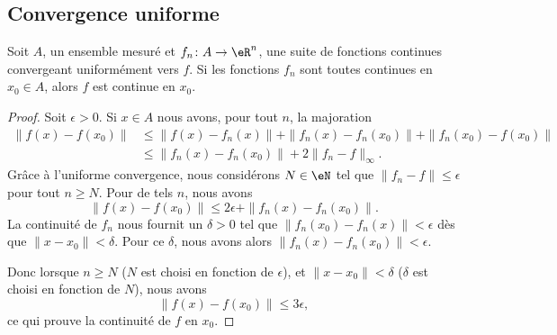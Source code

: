 \subsection{Convergence uniforme}


\begin{theorem}			\label{ThoUnigCvCont}
	Soit \( A\), un ensemble mesuré et \( f_n\colon A\to \eR^n\), une suite de fonctions continues convergeant uniformément vers \( f\). Si les fonctions \( f_n\) sont toutes continues en \( x_0\in A\), alors \( f\) est continue en \( x_0\).
\end{theorem}

\begin{proof}
	Soit \( \epsilon>0\). Si \( x\in A\) nous avons, pour tout \( n\), la majoration
	\begin{subequations}
		\begin{align}
			\| f(x)-f(x_0) \| & \leq \| f(x)-f_n(x) \|+\| f_n(x)-f_n(x_0) \|+\| f_n(x_0)-f(x_0) \| \\
			                  & \leq\| f_n(x)-f_n(x_0) \|+2\| f_n-f \|_{\infty}.
		\end{align}
	\end{subequations}
	Grâce à l'uniforme convergence, nous considérons \(N\in \eN\) tel que \( \| f_n-f \|\leq \epsilon\) pour tout \( n\geq N\). Pour de tels \( n\), nous avons
	\begin{equation}
		\| f(x)-f(x_0) \|\leq 2\epsilon+\| f_n(x)-f_n(x_0) \|.
	\end{equation}
	La continuité de \( f_n\) nous fournit un \( \delta>0\) tel que \( \| f_n(x_0)-f_n(x) \|<\epsilon\) dès que \( \| x-x_0 \|<\delta\). Pour ce \( \delta\), nous avons alors \( \| f_n(x)-f_n(x_0) \|<\epsilon\).

	Donc lorsque \( n\geq N\) (\( N\) est choisi en fonction de \( \epsilon\)), et \( \| x-x_0 \|<\delta\) (\( \delta\) est choisi en fonction de \( N\)), nous avons
	\begin{equation}
		\| f(x)-f(x_0) \|\leq 3\epsilon,
	\end{equation}
	ce qui prouve la continuité de \( f\) en \( x_0\).
\end{proof}

